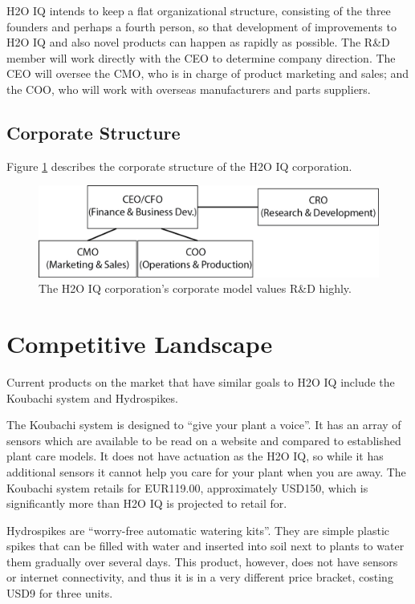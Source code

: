 \documentclass[11pt]{article}
\begin{document}
H2O IQ intends to keep a flat organizational structure, consisting of the three founders and perhaps a fourth person, so that development of improvements to H2O IQ and also novel products can happen as rapidly as possible.  The R\&D member will work directly with the CEO to determine company direction.  The CEO will oversee the CMO, who is in charge of product marketing and sales; and the COO, who will work with overseas manufacturers and parts suppliers.

\subsection{Corporate Structure}

Figure \ref{fig:structure} describes the corporate structure of the H2O IQ corporation.
\begin{figure}[h!]
\begin{center}
\includegraphics[width=5.5in]{./pngs/organizational-model.png}
\end{center}
\caption{The H2O IQ corporation's corporate model values R\&D highly.}
\label{fig:structure}
\end{figure}

\section{Competitive Landscape}

Current products on the market that have similar goals to H2O IQ include the Koubachi system and Hydrospikes.

The Koubachi system is designed to ``give your plant a voice''.  It has an array of sensors which are available to be read on a website and compared to established plant care models.  It does not have actuation as the H2O IQ, so while it has additional sensors it cannot help you care for your plant when you are away.  The Koubachi system retails for EUR119.00, approximately USD150, which is significantly more than H2O IQ is projected to retail for.

Hydrospikes are ``worry-free automatic watering kits''.  They are simple plastic spikes that can be filled with water and inserted into soil next to plants to water them gradually over several days.  This product, however, does not have sensors or internet connectivity, and thus it is in a very different price bracket, costing USD9 for three units.
\end{document}
